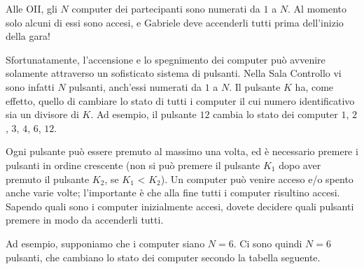 \usepackage{tabularx}
\usepackage{booktabs}
\usepackage{xcolor}
\usepackage{afterpage}
\usepackage{pifont,mdframed}
\usepackage{framed}
\usepackage[bottom]{footmisc}


\makeatletter
\gdef\this@inputfilename{input.txt}
\gdef\this@outputfilename{output.txt}
\makeatother

\newcommand{\inputfile}{\texttt{input.txt}}
\newcommand{\outputfile}{\texttt{output.txt}}

\newenvironment{warning}
  {\par\begin{mdframed}[linewidth=2pt,linecolor=gray]%
    \begin{list}{}{\leftmargin=1cm
                   \labelwidth=\leftmargin}\item[\Large\ding{43}]}
  {\end{list}\end{mdframed}\par}

Alle OII, gli $N$ computer dei partecipanti sono numerati da $1$ a $N$. Al momento solo alcuni di essi sono accesi, e Gabriele deve accenderli tutti prima dell'inizio della gara!

Sfortunatamente, l'accensione e lo spegnimento dei computer può avvenire solamente attraverso un sofisticato sistema di pulsanti. Nella Sala Controllo vi sono infatti $N$ pulsanti, anch'essi numerati da $1$ a $N$. Il pulsante $K$ ha, come effetto, quello di cambiare lo stato di tutti i computer il cui numero identificativo sia un divisore di $K$. Ad esempio, il pulsante $12$ cambia lo stato dei computer $1$, $2$, $3$, $4$, $6$, $12$.

Ogni pulsante può essere premuto al massimo una volta, ed è necessario premere i pulsanti in ordine crescente (non si può premere il pulsante $K_1$ dopo aver premuto il pulsante $K_2$, se $K_1$ < $K_2$). Un computer può venire acceso e/o spento anche varie volte; l'importante è che alla fine tutti i computer risultino accesi.
Sapendo quali sono i computer inizialmente accesi, dovete decidere quali pulsanti premere in modo da accenderli tutti.

Ad esempio, supponiamo che i computer siano $N=6$. Ci sono quindi $N=6$ pulsanti, che cambiano lo stato dei computer secondo la tabella seguente.\\[.1cm]


